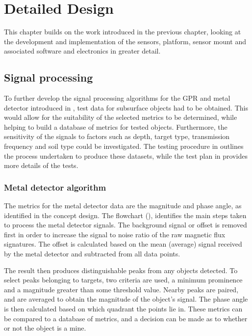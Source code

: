 \documentclass[main.tex]{subfiles}
\begin{document}
\chapter{Detailed Design}

This chapter builds on the work introduced in the previous chapter, looking at the development and implementation of the sensors, platform, sensor mount and associated software and electronics in greater detail. 

\section{Signal processing}
To further develop the signal processing algorithms for the GPR and metal detector introduced in , test data for subsurface objects had to be obtained. This would allow for the suitability of the selected metrics to be determined, while helping to build a database of metrics for tested objects. Furthermore, the sensitivity of the signals to factors such as depth, target type, transmission frequency and soil type could be investigated.  The testing procedure in  outlines the process undertaken to produce these datasets, while the test plan in  provides more details of the tests. 

\subsection{Metal detector algorithm}
The metrics for the metal detector data are the magnitude and phase angle, as identified in the concept design. The flowchart (), identifies the main steps taken to process the metal detector signals. The background signal or offset is removed first in order to increase the signal to noise ratio of the raw magnetic flux signatures. The offset is calculated based on the mean (average) signal received by the metal detector and subtracted from all data points. 

The result then produces distinguishable peaks from any objects detected. To select peaks belonging to targets, two criteria are used, a minimum prominence and a magnitude greater than some threshold value. Nearby peaks are paired, and are averaged to obtain the magnitude of the object’s signal. The phase angle is then calculated based on which quadrant the points lie in. These metrics can be compared to a database of metrics, and a decision can be made as to whether or not the object is a mine. 
\end{document}
